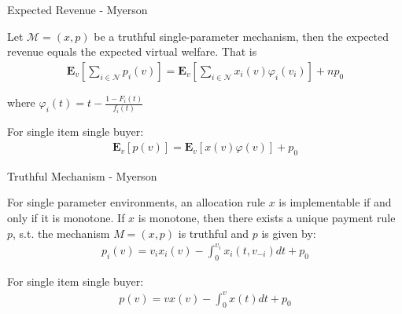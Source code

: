 \documentclass{beamer}
\begin{document}
\begin{frame}{Expected Revenue - Myerson}
  \begin{lemma}
    Let $\mathcal{M}=(x,p)$ be a truthful single-parameter mechanism, then the expected revenue equals the expected virtual welfare. That is
    \begin{align*}
      \mathbf{E}_v\left[\sum_{i \in \mathcal{N}}p_i(v)\right]
      = \mathbf{E}_v\left[\sum_{i \in \mathcal{N}}x_i(v)\varphi_i(v_i)\right] + n p_0
    \end{align*}

    where $\varphi_i(t) = t - \frac{1 - F_i(t)}{f_i(t)}$
  \end{lemma}

  For single item single buyer:
  \begin{align*}
    \mathbf{E}_v\left[p(v)\right]
    = \mathbf{E}_v\left[x(v)\varphi(v)\right] + p_0
  \end{align*}
\end{frame}

\begin{frame}{Truthful Mechanism - Myerson}
  \begin{lemma}
    For single parameter environments, an allocation rule $x$ is implementable if and only if it is monotone.
    If $x$ is monotone, then there exists a unique payment rule $p$, s.t. the mechanism $M=(x,p)$ is truthful
    and $p$ is given by:
    \begin{align*}
      p_i(v) = v_i x_i(v) - \int_0^{v_i} x_i(t,v_{-i})dt + p_0
    \end{align*}
  \end{lemma}

  For single item single buyer:
  \begin{align*}
    p(v) = v x(v) - \int_0^v x(t) dt + p_0
  \end{align*}
\end{frame}
\end{document}
